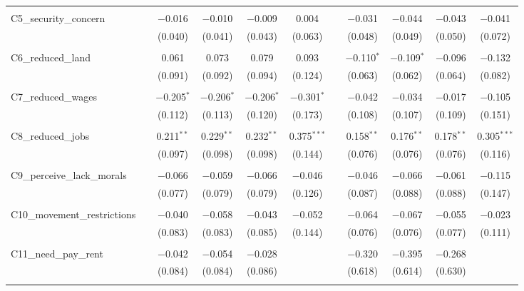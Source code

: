 \begin{table}[H]
\begin{tabular}{@{\extracolsep{4pt}}lcccccccccc}
  & & & & & & & & & & \\ 
 C5\_security\_concern &  & $-$0.016 & $-$0.010 & $-$0.009 & 0.004 &  & $-$0.031 & $-$0.044 & $-$0.043 & $-$0.041 \\ 
  &  & (0.040) & (0.041) & (0.043) & (0.063) &  & (0.048) & (0.049) & (0.050) & (0.072) \\ 
  & & & & & & & & & & \\ 
 C6\_reduced\_land &  & 0.061 & 0.073 & 0.079 & 0.093 &  & $-$0.110$^{*}$ & $-$0.109$^{*}$ & $-$0.096 & $-$0.132 \\ 
  &  & (0.091) & (0.092) & (0.094) & (0.124) &  & (0.063) & (0.062) & (0.064) & (0.082) \\ 
  & & & & & & & & & & \\ 
 C7\_reduced\_wages &  & $-$0.205$^{*}$ & $-$0.206$^{*}$ & $-$0.206$^{*}$ & $-$0.301$^{*}$ &  & $-$0.042 & $-$0.034 & $-$0.017 & $-$0.105 \\ 
  &  & (0.112) & (0.113) & (0.120) & (0.173) &  & (0.108) & (0.107) & (0.109) & (0.151) \\ 
  & & & & & & & & & & \\ 
 C8\_reduced\_jobs &  & 0.211$^{**}$ & 0.229$^{**}$ & 0.232$^{**}$ & 0.375$^{***}$ &  & 0.158$^{**}$ & 0.176$^{**}$ & 0.178$^{**}$ & 0.305$^{***}$ \\ 
  &  & (0.097) & (0.098) & (0.098) & (0.144) &  & (0.076) & (0.076) & (0.076) & (0.116) \\ 
  & & & & & & & & & & \\ 
 C9\_perceive\_lack\_morals &  & $-$0.066 & $-$0.059 & $-$0.066 & $-$0.046 &  & $-$0.046 & $-$0.066 & $-$0.061 & $-$0.115 \\ 
  &  & (0.077) & (0.079) & (0.079) & (0.126) &  & (0.087) & (0.088) & (0.088) & (0.147) \\ 
  & & & & & & & & & & \\ 
 C10\_movement\_restrictions &  & $-$0.040 & $-$0.058 & $-$0.043 & $-$0.052 &  & $-$0.064 & $-$0.067 & $-$0.055 & $-$0.023 \\ 
  &  & (0.083) & (0.083) & (0.085) & (0.144) &  & (0.076) & (0.076) & (0.077) & (0.111) \\ 
  & & & & & & & & & & \\ 
 C11\_need\_pay\_rent &  & $-$0.042 & $-$0.054 & $-$0.028 &  &  & $-$0.320 & $-$0.395 & $-$0.268 &  \\ 
  &  & (0.084) & (0.084) & (0.086) &  &  & (0.618) & (0.614) & (0.630) &  \\ 
  & & & & & & & & & & \\ 

\end{tabular}
\end{table}
